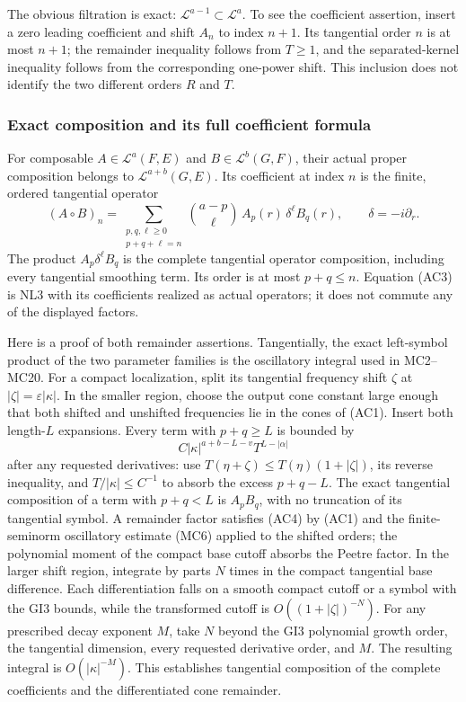 \documentclass[
  11pt,
]{article}
\begin{document}
The obvious filtration is exact:
\(\mathcal L^{a-1}\subset\mathcal L^a\). To see the coefficient
assertion, insert a zero leading coefficient and shift \(A_n\) to index
\(n+1\). Its tangential order \(n\) is at most \(n+1\); the remainder
inequality follows from \(T\geq1\), and the separated-kernel inequality
follows from the corresponding one-power shift. This inclusion does not
identify the two different orders \(R\) and \(T\).

\subsubsection{Exact composition and its full coefficient
formula}\label{exact-composition-and-its-full-coefficient-formula}

For composable \(A\in\mathcal L^a(F,E)\) and \(B\in\mathcal L^b(G,F)\),
their actual proper composition belongs to \(\mathcal L^{a+b}(G,E)\).
Its coefficient at index \(n\) is the finite, ordered tangential
operator \[
 (A\circ B)_n
 =\sum_{\substack{p,q,\ell\geq0\\p+q+\ell=n}}
  \binom{a-p}{\ell}\,
  A_p(r)\,\delta^\ell B_q(r),
 \qquad\delta=-i\partial_r .
 \tag{AC3}
\] The product \(A_p\delta^\ell B_q\) is the complete tangential
operator composition, including every tangential smoothing term. Its
order is at most \(p+q\leq n\). Equation (AC3) is NL3 with its
coefficients realized as actual operators; it does not commute any of
the displayed factors.

Here is a proof of both remainder assertions. Tangentially, the exact
left-symbol product of the two parameter families is the oscillatory
integral used in MC2--MC20. For a compact localization, split its
tangential frequency shift \(\zeta\) at \(|\zeta|=\varepsilon|\kappa|\).
In the smaller region, choose the output cone constant large enough that
both shifted and unshifted frequencies lie in the cones of (AC1). Insert
both length-\(L\) expansions. Every term with \(p+q\geq L\) is bounded
by \[
 C|\kappa|^{a+b-L-v}T^{L-|\alpha|}
 \tag{AC4}
\] after any requested derivatives: use
\(T(\eta+\zeta)\leq T(\eta)(1+|\zeta|)\), its reverse inequality, and
\(T/|\kappa|\leq C^{-1}\) to absorb the excess \(p+q-L\). The exact
tangential composition of a term with \(p+q<L\) is \(A_pB_q\), with no
truncation of its tangential symbol. A remainder factor satisfies (AC4)
by (AC1) and the finite-seminorm oscillatory estimate (MC6) applied to
the shifted orders; the polynomial moment of the compact base cutoff
absorbs the Peetre factor. In the larger shift region, integrate by
parts \(N\) times in the compact tangential base difference. Each
differentiation falls on a smooth compact cutoff or a symbol with the
GI3 bounds, while the transformed cutoff is \(O((1+|\zeta|)^{-N})\). For
any prescribed decay exponent \(M\), take \(N\) beyond the GI3
polynomial growth order, the tangential dimension, every requested
derivative order, and \(M\). The resulting integral is
\(O(|\kappa|^{-M})\). This establishes tangential composition of the
complete coefficients and the differentiated cone remainder.
\end{document}
